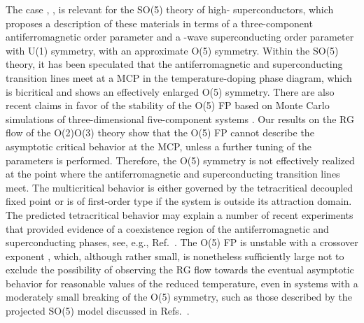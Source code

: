 \documentclass[a4paper,12pt]{article}
\begin{document}
The case \coordHE{}, \coordHE{}, \coordHE{} is relevant for the 
SO(5) theory \cite{Zhang-97,ZHAHA-99} of high-\coordHE{} superconductors,
which proposes a description of these materials in terms of a three-component
antiferromagnetic order parameter and 
a \coordHE{}-wave superconducting order parameter with U(1) symmetry,
with an approximate O(5) symmetry.
Within the SO(5) theory, it has been speculated that 
the antiferromagnetic and superconducting transition lines meet
at a MCP in the temperature-doping phase diagram,
which is bicritical and shows an effectively enlarged O(5) symmetry.
There are also recent claims in favor of the stability of the
O(5) FP based on Monte Carlo simulations
of three-dimensional five-component systems \cite{Hu-01}.
Our results on the RG flow of the O(2)\myHighlight{$\oplus$}\coordHE{}O(3) theory
show that the O(5) FP cannot describe the asymptotic critical behavior
at the MCP, unless a further tuning of the parameters is performed.
Therefore, the O(5) symmetry is not effectively realized at the 
point where the antiferromagnetic and superconducting transition 
lines meet. The multicritical behavior is either governed by the tetracritical
decoupled fixed point or is of first-order type if the system is outside 
its attraction domain.
The predicted tetracritical behavior may explain a number of recent experiments
that provided evidence of a coexistence region
of the antiferromagnetic and superconducting phases, see, e.g., 
Ref.~\cite{ZDS-02}.
The O(5) FP is unstable with a crossover exponent \coordHE{},
which, although rather small, is nonetheless sufficiently large  
not to exclude the possibility of observing 
the RG flow towards the eventual asymptotic behavior 
for reasonable values of the reduced temperature,
even in systems with a moderately small breaking of the O(5) symmetry,
such as those described by the projected SO(5) model discussed in 
Refs.~\cite{ZHAHA-99,Dorneich-etal-02}.
\end{document}
